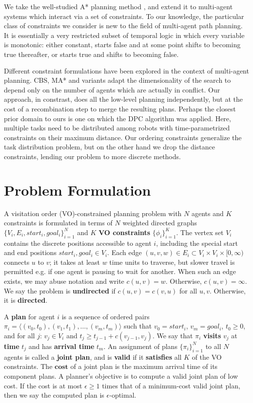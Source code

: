 \documentclass[letterpaper]{article}
\begin{document}
We take the well-studied A* planning method \cite{hart1968formal}, and extend it to multi-agent systems which interact via a set of constraints. To our knowledge, the particular class of constraints we consider is new to the field of multi-agent path planning. It is essentially a very restricted subset of temporal logic \cite{gabbay1994temporal} in which every variable is monotonic: either constant, starts false and at some point shifts to becoming true thereafter, or starts true and shifts to becoming false.

Different constraint formulations have been explored in the context of multi-agent planning. CBS, MA* and variants \cite{ferner2013odrm}\cite{sharon2015conflict}  adapt the dimensionality of the search to depend only on the number of agents which are actually in conflict. Our approach, in constrast, does all the low-level planning independently, but at the cost of a recombination step to merge the resulting plans. Perhaps the closest prior domain to ours is one on which the DPC algorithm \cite{bhattacharya2010multi} was applied. Here, multiple tasks need to be distributed among robots with time-parametrized constraints on their maximum distance. Our ordering constraints generalize the task distribution problem, but on the other hand we drop the distance constraints, lending our problem to more discrete methods.

\section{Problem Formulation}

A visitation order (VO)-constrained planning problem with $N$ agents and $K$ constraints is formulated in terms of $N$ weighted directed graphs $\{V_i,E_i,start_i,goal_i\}_{i=1}^N$ and $K$ \textbf{VO constraints} $\{\phi_i\}_{i=1}^K$. The vertex set $V_i$ contains the discrete positions accessible to agent $i$, including the special start and end positions $start_i,goal_i\in V_i$. Each edge $(u,v,w)\in E_i \subset V_i\times V_i\times [0,\infty)$ connects $u$ to $v$; it takes at least $w$ time units to traverse, but slower travel is permitted e.g. if one agent is pausing to wait for another. When such an edge exists, we may abuse notation and write $c(u,v) = w$. Otherwise, $c(u,v) = \infty$. We say the problem is \textbf{undirected} if $c(u,v) = c(v,u)$ for all $u,v$. Otherwise, it is \textbf{directed}.

A \textbf{plan} for agent $i$ is a sequence of ordered pairs $\pi_i = \langle (v_0,t_0),(v_1,t_1),\ldots,(v_m,t_m) \rangle$ such that $v_0 = start_i$, $v_m = goal_i$, $t_0 \ge 0$, and for all $j$: $v_j \in V_i$ and $t_{j} \ge t_{j-1} + c(v_{j-1},v_j)$. We say that $\pi_i$ \textbf{visits} $v_j$ at \textbf{time} $t_j$ and has \textbf{arrival time} $t_m$. An assignment of plans $\{\pi_i\}_{i=1}^N$ to all $N$ agents is called a \textbf{joint plan}, and is \textbf{valid} if it \textbf{satisfies} all $K$ of the VO constraints. The $\textbf{cost}$ of a joint plan is the maximum arrival time of its component plans. A planner's objective is to compute a valid joint plan of low cost. If the cost is at most $\epsilon \ge 1$ times that of a minimum-cost valid joint plan, then we say the computed plan is $\epsilon$-optimal.
\end{document}

